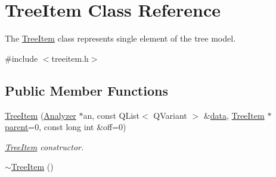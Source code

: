 \hypertarget{class_tree_item}{\section{Tree\-Item Class Reference}
\label{class_tree_item}
}


The \hyperlink{class_tree_item}{Tree\-Item} class represents single element of the tree model.  




{\ttfamily \#include $<$treeitem.\-h$>$}

\subsection*{Public Member Functions}
\begin{DoxyCompactItemize}
\item 
\hyperlink{class_tree_item_ad70866c7a97127bee8a5b11c9f87e2ca}{Tree\-Item} (\hyperlink{class_analyzer}{Analyzer} $\ast$an, const Q\-List$<$ Q\-Variant $>$ \&\hyperlink{class_tree_item_a16641e42c78f004d47a66f3b2c39341f}{data}, \hyperlink{class_tree_item}{Tree\-Item} $\ast$\hyperlink{class_tree_item_a392ec493dfab91ee474d7ff83e2c0211}{parent}=0, const long int \&off=0)
\begin{DoxyCompactList}\small\item\em \hyperlink{class_tree_item}{Tree\-Item} constructor. \end{DoxyCompactList}\item 
\hypertarget{class_tree_item_a859429185d908c3e54861bbbfb185425}{\hyperlink{class_tree_item_a859429185d908c3e54861bbbfb185425}{$\sim$\-Tree\-Item} ()}\label{class_tree_item_a859429185d908c3e54861bbbfb185425}


\end{DoxyCompactItemize}

